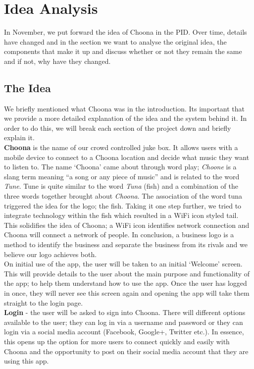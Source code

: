 \section{Idea Analysis}
In November, we put forward the idea of Choona in the PID.  Over time, details have changed and in the section we want to analyse the original idea, the components that make it up and discuss whether or not they remain the same and if not, why have they changed.  

\subsection{The Idea}
We briefly mentioned what Choona was in the introduction.  Its important that we provide a more detailed explanation of the idea and the system behind it.  In order to do this, we will break each section of the project down and briefly explain it.  \\
\textbf{Choona} is the name of our crowd controlled juke box.  It allows users with a mobile device to connect to a Choona location and decide what music they want to listen to.  The name `Choona' came about through word play; \emph{Choone} is a slang term meaning ``a song or any piece of music'' and is related to the word \emph{Tune}.  Tune is quite similar to the word \emph{Tuna} (fish) and a combination of the three words together brought about \emph{Choona}.  The association of the word tuna triggered the idea for the logo; the fish.  Taking it one step further, we tried to integrate technology within the fish which resulted in a WiFi icon styled tail.  This solidifies the idea of Choona; a WiFi icon identifies network connection and Choona will connect a network of people.  In conclusion, a business logo is a method to identify the business and separate the business from its rivals and we believe our logo achieves both. \\

On initial use of the app, the user will be taken to an initial `Welcome' screen.  This will provide details to the user about the main purpose and functionality of the app; to help them understand how to use the app.  Once the user has logged in once, they will never see this screen again and opening the app will take them straight to the login page.  \\

\textbf{Login} - the user will be asked to sign into Choona.  There will different options available to the user; they can log in via a username and password or they can login via a social media account (Facebook, Google+, Twitter etc.).  In essence, this opens up the option for more users to connect quickly and easily with Choona and the opportunity to post on their social media account that they are using this app.  \\

